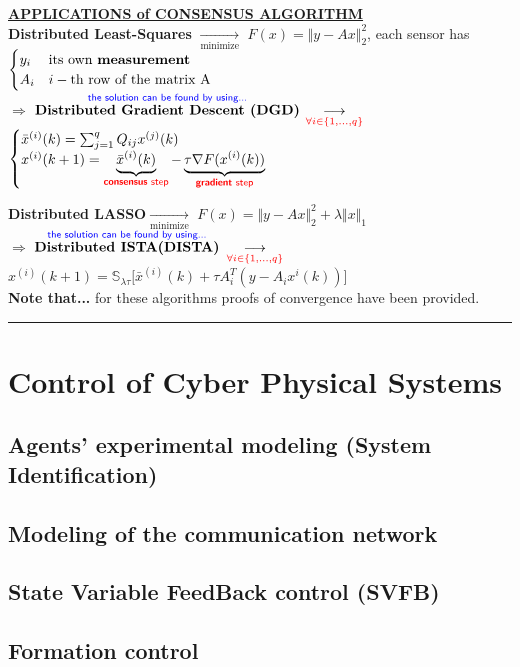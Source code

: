 \documentclass[a4paper, 12pt]{article}
\begin{document}
\noindent
{\underline{\normalsize\textbf{APPLICATIONS of CONSENSUS ALGORITHM}}}\\
\textbf{\textsf{Distributed Least-Squares}} $\underset{\text{minimize}}{\longrightarrow}$ $F(x)=\Vert y-Ax \Vert_2^2$, each sensor has $\begin{cases}
    y_i & \text{its own \textbf{measurement}}\\
    A_i & i-\text{th row of the matrix A}
\end{cases}$ \\
$\Longrightarrow$ 
$\overset{\textsf{\color{blue}the solution can be found by using...}}{\textbf{Distributed Gradient Descent (DGD)}}$
    $\underset{\color{red}\forall i\in\{1,...,q\}}{\longrightarrow}$
  $ \begin{cases}
    \bar{x}^{(i)}(k)=\sum_{j=1}^{q} Q_{ij}x^{(j)}(k) \\
    x^{(i)}(k+1)=\underbrace{\bar{x}^{(i)}(k)}_\textsf{\color{red} \textbf{consensus} step}-\underbrace{\tau\nabla F(x^{(i)}(k))}_\textsf{\color{red}\textbf{gradient} step}
\end{cases}$

\noindent
\textbf{\textsf{Distributed LASSO}}$\underset{\text{minimize}}{\longrightarrow}$ $F(x)=\Vert y-Ax \Vert_2^2 + \lambda \Vert x \Vert_1$\\
$\Longrightarrow$ 
$\overset{\textsf{\color{blue}the solution can be found by using...}}{\textbf{Distributed ISTA(DISTA)}}$
$\underset{\color{red}\forall i\in\{1,...,q\}}{\longrightarrow}$
{\large{
    $x^{(i)}(k+1)=\mathbb{S}_{\lambda\tau}\big[ 
        \bar{x}^{(i)}(k) +
        \tau A_i^T(y-A_ix^{i}(k))    
    \big]$
}}\\

\noindent
{\small{
    \textbf{Note that...} for these algorithms proofs of convergence have been provided.
}}

\begin{center}
    \rule{300pt}{.2pt}
    \vspace{-1ex}
\end{center}


\section{Control of Cyber Physical Systems}
\subsection*{Agents' experimental modeling (System Identification) }
\subsection*{Modeling of the communication network}
\subsection*{State Variable FeedBack control (SVFB)}
\subsection*{Formation control}
\end{document}
